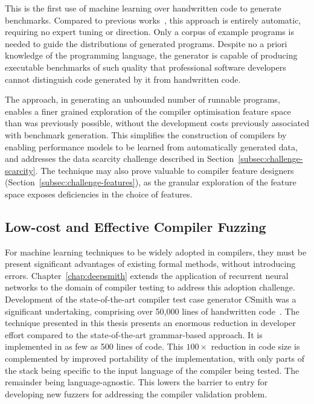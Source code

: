 This is the first use of machine learning over handwritten code to generate benchmarks. Compared to previous works~\cite{Chiu2015}, this approach is entirely automatic, requiring no expert tuning or direction. Only a corpus of example programs is needed to guide the distributions of generated programs. Despite no a priori knowledge of the programming language, the generator is capable of producing executable benchmarks of such quality that professional software developers cannot distinguish code generated by it from handwritten code.

The approach, in generating an unbounded number of runnable programs, enables a finer grained exploration of the compiler optimisation feature space than was previously possible, without the development costs previously associated with benchmark generation. This simplifies the construction of compilers by enabling performance models to be learned from automatically generated data, and addresses the data scarcity challenge described in Section~\ref{subsec:challenge-scarcity}. The technique may also prove valuable to compiler feature designers (Section~\ref{subsec:challenge-features}), as the granular exploration of the feature space exposes deficiencies in the choice of features.


\subsection{Low-cost and Effective Compiler Fuzzing}

For machine learning techniques to be widely adopted in compilers, they must be present significant advantages of existing formal methods, without introducing errors. Chapter~\ref{chap:deepsmith} extends the application of recurrent neural networks to the domain of compiler testing to address this adoption challenge. Development of the state-of-the-art compiler test case generator CSmith was a significant undertaking, comprising over 50,000 lines of handwritten code~\cite{Yang2011,Lidbury2015a}. The technique presented in this thesis presents an enormous reduction in developer effort compared to the state-of-the-art grammar-based approach. It is implemented in as few as 500 lines of code. This $100\times$ reduction in code size is complemented by improved portability of the implementation, with only parts of the stack being specific to the input language of the compiler being tested. The remainder being language-agnostic. This lowers the barrier to entry for developing new fuzzers for addressing the compiler validation problem.

